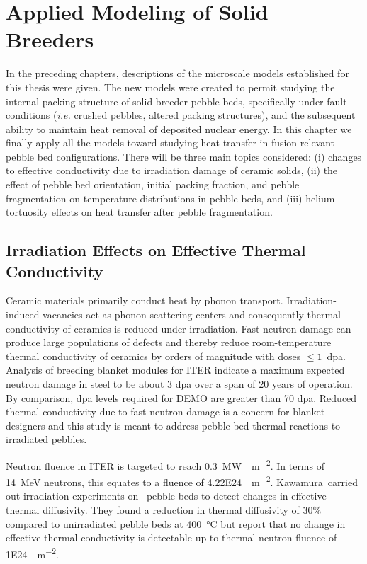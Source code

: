 \chapter{Applied Modeling of Solid Breeders}\label{sec:dem-studies}

In the preceding chapters, descriptions of the microscale models established for this thesis were given. The new models were created to permit studying the internal packing structure of solid breeder pebble beds, specifically under fault conditions (\textit{i.e.} crushed pebbles, altered packing structures), and the subsequent ability to maintain heat removal of deposited nuclear energy. In this chapter we finally apply all the models toward studying heat transfer in fusion-relevant pebble bed configurations. There will be three main topics considered: (i) changes to effective conductivity due to irradiation damage of ceramic solids, (ii) the effect of pebble bed orientation, initial packing fraction, and pebble fragmentation on temperature distributions in pebble beds, and (iii) helium tortuosity effects on heat transfer after pebble fragmentation. 


\section{Irradiation Effects on Effective Thermal Conductivity}\label{sec:irradiation}
Ceramic materials primarily conduct heat by phonon transport. Irradiation-induced vacancies act as phonon scattering centers and consequently thermal conductivity of ceramics is reduced under irradiation.\cite{Hopkins1985} Fast neutron damage can produce large populations of defects and thereby reduce room-temperature thermal conductivity of ceramics by orders of magnitude with doses $\le 1$~dpa.\cite{Snead2005} Analysis of breeding blanket modules for ITER indicate a maximum expected neutron damage in steel to be about 3 dpa over a span of 20 years of operation. By comparison, dpa levels required for DEMO are greater than 70 dpa.\cite{Giancarli2006a} Reduced thermal conductivity due to fast neutron damage is a concern for blanket designers and this study is meant to address pebble bed thermal reactions to irradiated pebbles.

Neutron fluence in ITER is targeted to reach \SI{0.3}{\mega\watt\year\per\square\meter}.\cite{Abdou2015,VanHoutte2011} In terms of \SI{14}{\mega\electronvolt} neutrons, this equates to a fluence of \SI{4.22E24}{\neutron\per\meter\squared}. Kawamura\etal~carried out irradiation experiments on \lit~pebble beds to detect changes in effective thermal diffusivity. They found a reduction in thermal diffusivity of 30\% compared to unirradiated pebble beds at \SI{400}{\celsius} but report that no change in effective thermal conductivity is detectable up to thermal neutron fluence of \SI{1E24}{\neutron\per\meter\squared}. 

